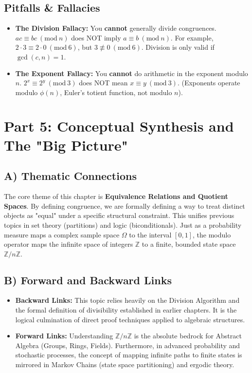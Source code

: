 \documentclass[11pt]{article}
\newcommand{\Z}{\mathbb{Z}}
\newcommand{\modulo}[1]{\ (\mathrm{mod}\ #1)}
\begin{document}
\subsection{Pitfalls \& Fallacies}
\begin{itemize}
    \item \textbf{The Division Fallacy:} You \textbf{cannot} generally divide congruences. $ac \equiv bc \modulo{n}$ does NOT imply $a \equiv b \modulo{n}$. For example, $2 \cdot 3 \equiv 2 \cdot 0 \modulo{6}$, but $3 \not\equiv 0 \modulo{6}$. Division is only valid if $\gcd(c, n) = 1$.
    \item \textbf{The Exponent Fallacy:} You \textbf{cannot} do arithmetic in the exponent modulo $n$. $2^x \equiv 2^y \modulo{3}$ does NOT mean $x \equiv y \modulo{3}$. (Exponents operate modulo $\phi(n)$, Euler's totient function, not modulo $n$).
\end{itemize}

\newpage
\section{Part 5: Conceptual Synthesis and The "Big Picture"}

\subsection{A) Thematic Connections}
The core theme of this chapter is \textbf{Equivalence Relations and Quotient Spaces}. By defining congruence, we are formally defining a way to treat distinct objects as "equal" under a specific structural constraint. This unifies previous topics in set theory (partitions) and logic (biconditionals). Just as a probability measure maps a complex sample space $\Omega$ to the interval $[0,1]$, the modulo operator maps the infinite space of integers $\Z$ to a finite, bounded state space $\Z/n\Z$.

\subsection{B) Forward and Backward Links}
\begin{itemize}
    \item \textbf{Backward Links:} This topic relies heavily on the Division Algorithm and the formal definition of divisibility established in earlier chapters. It is the logical culmination of direct proof techniques applied to algebraic structures.
    \item \textbf{Forward Links:} Understanding $\Z/n\Z$ is the absolute bedrock for Abstract Algebra (Groups, Rings, Fields). Furthermore, in advanced probability and stochastic processes, the concept of mapping infinite paths to finite states is mirrored in Markov Chains (state space partitioning) and ergodic theory.
\end{itemize}
\end{document}
